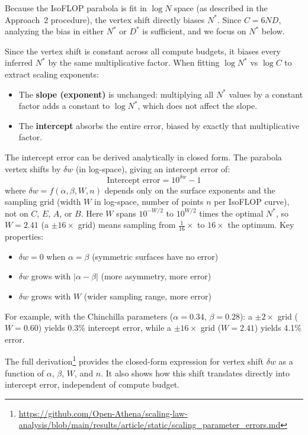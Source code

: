 \documentclass[11pt]{article}
\begin{document}
Because the IsoFLOP parabola is fit in $\log N$ space (as described in the
Approach~2 procedure), the vertex shift directly biases $N^*$. Since
$C = 6ND$, analyzing the bias in either $N^*$ or $D^*$ is sufficient, and we
focus on $N^*$ below.

Since the vertex shift is constant across all compute budgets, it biases every
inferred $N^*$ by the same multiplicative factor. When fitting $\log N^*$ vs
$\log C$ to extract scaling exponents:
\begin{itemize}
    \item The \textbf{slope (exponent)} is unchanged: multiplying all $N^*$
        values by a constant factor adds a constant to $\log N^*$, which does
        not affect the slope.
    \item The \textbf{intercept} absorbs the entire error, biased by exactly
        that multiplicative factor.
\end{itemize}

The intercept error can be derived analytically in closed form. The parabola
vertex shifts by $\delta w$ (in log-space), giving an intercept error of:
\begin{equation}
    \text{Intercept error} = 10^{\delta w} - 1
    \label{eq:intercept_error}
\end{equation}
where $\delta w = f(\alpha, \beta, W, n)$ depends only on the surface exponents
and the sampling grid (width $W$ in log-space, number of points $n$ per
IsoFLOP curve), not on $C$, $E$, $A$, or $B$. Here $W$ spans $10^{-W/2}$ to
$10^{W/2}$ times the optimal $N^*$, so $W = 2.41$ (a $\pm 16\times$ grid) means
sampling from $\frac{1}{16}\times$ to $16\times$ the optimum. Key properties:
\begin{itemize}
    \item $\delta w = 0$ when $\alpha = \beta$ (symmetric surfaces have no error)
    \item $\delta w$ grows with $|\alpha - \beta|$ (more asymmetry, more error)
    \item $\delta w$ grows with $W$ (wider sampling range, more error)
\end{itemize}

For example, with the Chinchilla parameters ($\alpha = 0.34$,
$\beta = 0.28$): a $\pm 2\times$ grid ($W = 0.60$) yields 0.3\% intercept
error, while a $\pm 16\times$ grid ($W = 2.41$) yields 4.1\% error.

The full
derivation\footnote{\url{https://github.com/Open-Athena/scaling-law-analysis/blob/main/results/article/static/scaling_parameter_errors.md}}
provides the closed-form expression for vertex shift $\delta w$ as a function
of $\alpha$, $\beta$, $W$, and $n$. It also shows how this shift translates
directly into intercept error, independent of compute budget.
\end{document}
